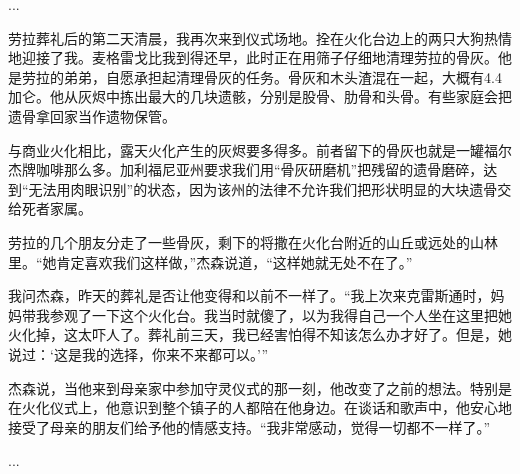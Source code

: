 \documentclass[12pt,oneside]{book}
\begin{document}
\begin{bookref}[frametitle={\cite{好好告别}}]
...

劳拉葬礼后的第二天清晨，我再次来到仪式场地。拴在火化台边上的两只大狗热情地迎接了我。麦格雷戈比我到得还早，此时正在用筛子仔细地清理劳拉的骨灰。他是劳拉的弟弟，自愿承担起清理骨灰的任务。骨灰和木头渣混在一起，大概有4.4加仑。他从灰烬中拣出最大的几块遗骸，分别是股骨、肋骨和头骨。有些家庭会把遗骨拿回家当作遗物保管。

与商业火化相比，露天火化产生的灰烬要多得多。前者留下的骨灰也就是一罐福尔杰牌咖啡那么多。加利福尼亚州要求我们用“骨灰研磨机”把残留的遗骨磨碎，达到“无法用肉眼识别”的状态，因为该州的法律不允许我们把形状明显的大块遗骨交给死者家属。

劳拉的几个朋友分走了一些骨灰，剩下的将撒在火化台附近的山丘或远处的山林里。“她肯定喜欢我们这样做，”杰森说道，“这样她就无处不在了。”

我问杰森，昨天的葬礼是否让他变得和以前不一样了。“我上次来克雷斯通时，妈妈带我参观了一下这个火化台。我当时就傻了，以为我得自己一个人坐在这里把她火化掉，这太吓人了。葬礼前三天，我已经害怕得不知该怎么办才好了。但是，她说过：‘这是我的选择，你来不来都可以。’”

杰森说，当他来到母亲家中参加守灵仪式的那一刻，他改变了之前的想法。特别是在火化仪式上，他意识到整个镇子的人都陪在他身边。在谈话和歌声中，他安心地接受了母亲的朋友们给予他的情感支持。“我非常感动，觉得一切都不一样了。”

...

\end{bookref}
\end{document}
